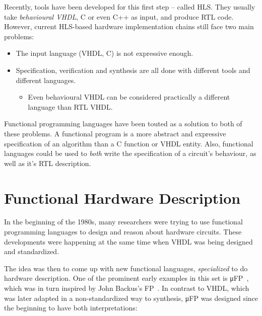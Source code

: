         Recently, tools have been developed for this first step -- called \ac{HLS}.
        They usually take \emph{behavioural \acs{VHDL}}, C or even C++ as input, and produce \ac{RTL} code.
        However, current \acs{HLS}-based hardware implementation chains still face two main problems:

        \begin{itemize}
            \item The input language (VHDL, C) is not expressive enough.
            \item Specification, verification and synthesis are all done with different tools and different languages.
            \begin{itemize}
                \item Even behavioural \acs{VHDL} can be considered practically a different language
                    than \acl{RTL} \acs{VHDL}.
            \end{itemize}
        \end{itemize}

        Functional programming languages have been touted as a solution to both of these problems.
        A functional program is a more abstract and expressive specification of an algorithm than
        a C function or VHDL entity.
        Also, functional languages could be used to \emph{both} write the specification of a circuit's behaviour,
        as well as it's \acl{RTL} description.


    \section{Functional Hardware Description}
    \label{sec:functional-hardware}
        In the beginning of the 1980s, many researchers were trying to use functional programming languages
        to design and reason about hardware circuits.
        These developments were happening at the same time when \ac{VHDL} was being designed and standardized.

        The idea was then to come up with new functional languages, \emph{specialized} to do hardware description.
        One of the prominent early examples in this set is μFP~\cite{mufp-1984},
        which was in turn inspired by John Backus's FP~\cite{backus-turing-lecture}.
        In contrast to \ac{VHDL}, which was later adapted in a non-standardized way to synthesis,
        μFP was designed since the beginning to have both interpretations:

